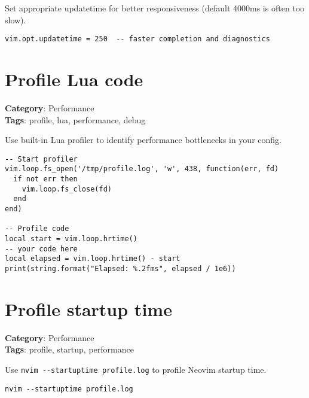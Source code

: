 {{{{{{{{{{Set appropriate updatetime for better responsiveness (default 4000ms is often too slow).

\begin{Exa*}{}
\begin{Verbatim}[fontsize=\footnotesize, breaklines, breakanywhere]
vim.opt.updatetime = 250  -- faster completion and diagnostics
\end{Verbatim}
\end{Exa*}

\section{Profile Lua code}

\textbf{Category}: Performance\\ \textbf{Tags}: profile, lua, performance, debug
\vspace{0.5cm}

Use built-in Lua profiler to identify performance bottlenecks in your config.

\begin{Exa*}{}
\begin{Verbatim}[fontsize=\footnotesize, breaklines, breakanywhere]
-- Start profiler
vim.loop.fs_open('/tmp/profile.log', 'w', 438, function(err, fd)
  if not err then
    vim.loop.fs_close(fd)
  end
end)

-- Profile code
local start = vim.loop.hrtime()
-- your code here
local elapsed = vim.loop.hrtime() - start
print(string.format("Elapsed: %.2fms", elapsed / 1e6))
\end{Verbatim}
\end{Exa*}

\section{Profile startup time}

\textbf{Category}: Performance\\ \textbf{Tags}: profile, startup, performance
\vspace{0.5cm}

Use {\footnotesize \Verb§nvim --startuptime profile.log§} to profile Neovim startup time.

\begin{Exa*}{}
\begin{Verbatim}[fontsize=\footnotesize, breaklines, breakanywhere]
nvim --startuptime profile.log
\end{Verbatim}
\end{Exa*}

}}}}}}}}}}
